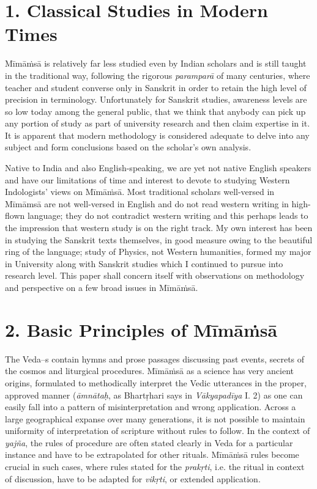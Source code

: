 \vspace{-.3cm}

\section*{1. Classical Studies in Modern Times}

Mīmāṁsā is relatively far less studied even by Indian scholars and is still taught in the traditional way, following the rigorous \textit{paramparā} of many centuries, where teacher and student converse only in Sanskrit in order to retain the high level of precision in terminology. Unfortunately for Sanskrit studies, awareness levels are so low today among the general public, that we think that anybody can pick up any portion of study as part of university research and then claim expertise in it. It is apparent that modern methodology is considered adequate to delve into any subject and form conclusions based on the scholar’s own analysis.

Native to India and also English-speaking, we are yet not native English speakers and have our limitations of time and interest to devote to studying Western Indologists’ views on Mīmāṁsā. Most traditional scholars well-versed in Mīmāmsā are not well-versed in English and do not read western writing in high-flown language; they do not contradict western writing and this perhaps leads to the impression that western study is on the right track. My own interest has been in studying the Sanskrit texts themselves, in good measure owing to the beautiful ring of the language; study of Physics, not Western humanities, formed my major in University along with Sanskrit studies which I continued to pursue into research level. This paper shall concern itself with observations on methodology and perspective on a few broad issues in Mīmāṁsā.

\vspace{-.3cm}

\section*{2. Basic Principles of Mīmāṁsā}

The Veda--s contain hymns and prose passages discussing past events, secrets of the cosmos and liturgical procedures. Mīmāṁsā as a science has very ancient origins, formulated to methodically interpret the Vedic utterances in the proper, approved manner (\textit{āmnātaḥ}, as Bhartṛhari says in \textit{Vākyapadīya} I. 2) as one can easily fall into a pattern of misinterpretation and wrong application. Across a large geographical expanse over many generations, it is not possible to maintain uniformity of interpretation of scripture without rules to follow. In the context of \textit{yajña}, the rules of procedure are often stated clearly in Veda for a particular instance and have to be extrapolated for other rituals. Mīmāṁsā rules become crucial in such cases, where rules stated for the \textit{prakṛti}, i.e. the ritual in context of discussion, have to be adapted for \textit{vikṛti}, or extended application.

